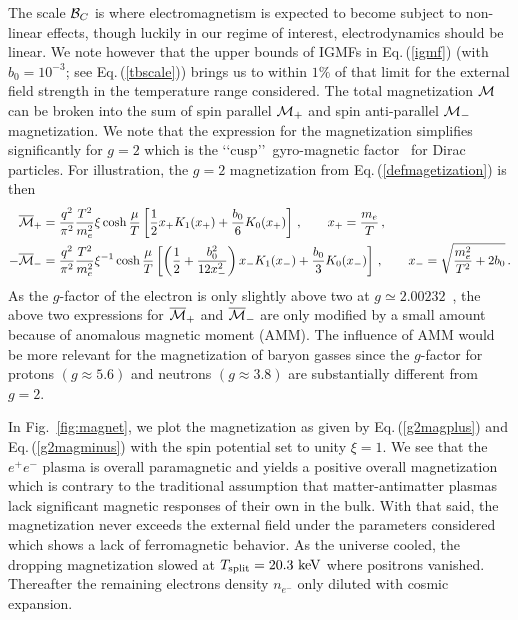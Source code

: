 \documentclass[a4paper]{article}
\newcommand*{\keV}{\text{ keV}}
\newcommand{\req}[1]{Eq.\,(\ref{#1})}
\newcommand{\rf}[1]{Fig.~{\ref{#1}}}
\begin{document}
The scale ${\cal B}_{C}$ is where electromagnetism is expected to become subject to non-linear effects, though luckily in our regime of interest, electrodynamics should be linear. We note however that the upper bounds of IGMFs in \req{igmf} (with $b_{0}=10^{-3}$; see \req{tbscale}) brings us to within $1\%$ of that limit for the external field strength in the temperature range considered. The total magnetization ${\cal M}$ can be broken into the sum of spin parallel ${\cal M}_{+}$ and spin anti-parallel ${\cal M}_{-}$ magnetization. We note that the expression for the magnetization simplifies significantly for $g=2$ which is the \lq\lq cusp\rq\rq\ gyro-magnetic factor~\cite{rafelski2022study} for Dirac particles. For illustration, the $g=2$ magnetization from \req{defmagetization} is then
\begin{align}
    \label{g2magplus}
    {\overline{\cal M}}_{+}&=\frac{q^{2}}{\pi^{2}}\frac{T^{2}}{m_{e}^{2}}\xi\cosh{\frac{\mu}{T}}\left[\frac{1}{2}x_{+}K_{1}(x_{+})+\frac{b_{0}}{6}K_{0}(x_{+})\right]\,,\qquad x_{+}=\frac{m_{e}}{T}\,,\\
    \label{g2magminus}
    -{\overline{\cal M}}_{-}&=\frac{q^{2}}{\pi^{2}}\frac{T^{2}}{m_{e}^{2}}\xi^{-1}\cosh{\frac{\mu}{T}}\left[\left(\frac{1}{2}+\frac{b_{0}^{2}}{12x_{-}^{2}}\right)x_{-}K_{1}(x_{-})+\frac{b_{0}}{3}K_{0}(x_{-})\right]\,,\qquad x_{-}=\sqrt{\frac{m_{e}^{2}}{T^{2}}+2b_{0}}\,.
\end{align}
As the $g$-factor of the electron is only slightly above two at $g\simeq2.00232$~\cite{tiesinga2021codata}, the above two expressions for ${\overline{\cal M}}_{+}$ and ${\overline{\cal M}}_{-}$ are only modified by a small amount because of anomalous magnetic moment (AMM). The influence of AMM would be more relevant for the magnetization of baryon gasses since the $g$-factor for protons $(g\approx5.6)$ and neutrons $(g\approx3.8)$ are substantially different from $g=2$.

In \rf{fig:magnet}, we plot the magnetization as given by \req{g2magplus} and \req{g2magminus} with the spin potential set to unity $\xi=1$. We see that the $e^{+}e^{-}$ plasma is overall paramagnetic and yields a positive overall magnetization which is contrary to the traditional assumption that matter-antimatter plasmas lack significant magnetic responses of their own in the bulk. With that said, the magnetization never exceeds the external field under the parameters considered which shows a lack of ferromagnetic behavior. As the universe cooled, the dropping magnetization slowed at $T_{\rm split}=20.3\keV$ where positrons vanished. Thereafter the remaining electrons density $n_{e^{-}}$ only diluted with cosmic expansion.
\end{document}
